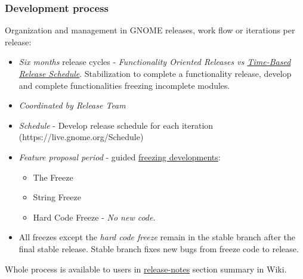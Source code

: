 \subsubsection{ Development process} Organization and management in GNOME releases, work flow or iterations per release:
\\
\begin{itemize}
	\item \textit{Six months} release cycles - \textit{Functionality Oriented Releases vs \href{https://live.gnome.org/ReleasePlanning/TimeBased}{Time-Based Release Schedule}}. Stabilization to complete a functionality release, develop and complete functionalities freezing incomplete modules.
	\item \textit{Coordinated by Release Team}
	\item \textit{Schedule} - Develop release schedule for each iteration (https://live.gnome.org/Schedule)
	\item \textit{Feature proposal period} - guided \href{https://live.gnome.org/ReleasePlanning/Freezes}{freezing developments}:
\begin{itemize}
	\item The Freeze
	\item String Freeze
	\item Hard Code Freeze - \textit{No new code}.
\end{itemize}
	\item All freezes except the \textit{hard code freeze} remain in the stable branch after the final stable release. Stable branch fixes new bugs from freeze code to release.
\end{itemize} Whole process is available to users in \href{https://help.gnome.org/misc/release-notes/3.6/}{release-notes} section summary in Wiki.
\\